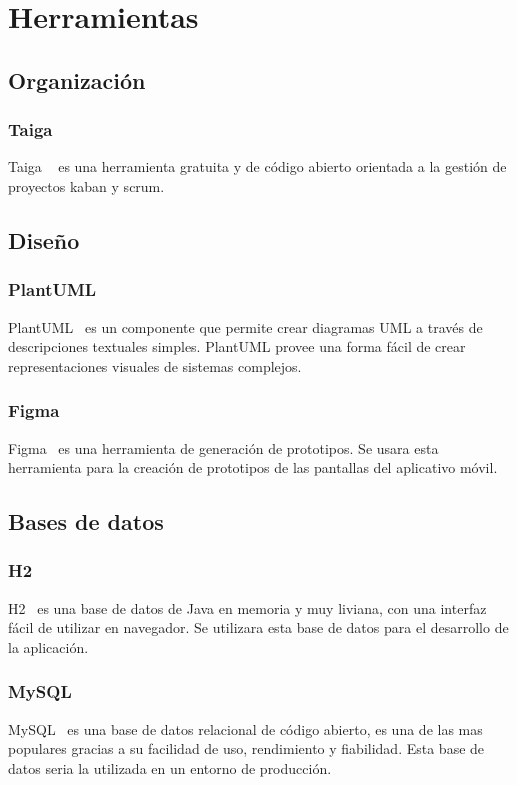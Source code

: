 \section{Herramientas}
    \subsection{Organización}
        \subsubsection{Taiga}
        Taiga ~\cite{Taiga} es una herramienta gratuita y de código abierto orientada a la gestión de proyectos kaban y scrum.
    \subsection{Diseño}
        \subsubsection{PlantUML}
        PlantUML~\cite{Plantuml} es un componente que permite crear diagramas UML a través de descripciones textuales simples. PlantUML provee una forma fácil de crear representaciones visuales de sistemas complejos.
        \subsubsection{Figma}
        Figma~\cite{Figma} es una herramienta de generación de prototipos. Se usara esta herramienta para la creación de prototipos de las pantallas del aplicativo móvil.
    \subsection{Bases de datos}
        \subsubsection{H2}
        H2~\cite{H2} es una base de datos de Java en memoria y muy liviana, con una interfaz fácil de utilizar en navegador. Se utilizara esta base de datos para el desarrollo de la aplicación.
        \subsubsection{MySQL}
        MySQL~\cite{MySQL} es una base de datos relacional de código abierto, es una de las mas populares gracias a su facilidad de uso, rendimiento y fiabilidad. Esta base de datos seria la utilizada en un entorno de producción.
